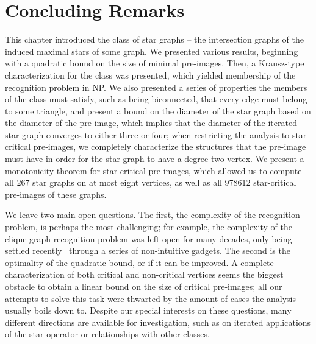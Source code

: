 \section{Concluding Remarks}

This chapter introduced the class of star graphs -- the intersection graphs of the induced maximal stars of some graph.
We presented various results, beginning with a quadratic bound on the size of minimal pre-images.
Then, a Krausz-type characterization for the class was presented, which yielded membership of the recognition problem in \textsf{NP}.
We also presented a series of properties the members of the class must satisfy, such as being biconnected, that every edge must belong to some triangle, and present a bound on the diameter of the star graph based on the diameter of the pre-image, which implies that the diameter of the iterated star graph converges to either three or four;  when restricting the analysis to star-critical pre-images, we completely characterize the structures that the pre-image must have in order for the star graph to have a degree two vertex.
We present a monotonicity theorem for star-critical pre-images, which allowed us to compute all 267 star graphs on at most eight vertices, as well as all 978612 star-critical pre-images of these graphs.

We leave two main open questions.
The first, the complexity of the recognition problem, is perhaps the most challenging; for example, the complexity of the clique graph recognition problem was left open for many decades, only being settled recently~\citep{clique_recognition} through a series of non-intuitive gadgets.
The second is the optimality of the quadratic bound, or if it can be improved.
A complete characterization of both critical and non-critical vertices seems the biggest obstacle to obtain a linear bound on the size of critical pre-images; all our attempts to solve this task were thwarted by the amount of cases the analysis usually boils down to.
Despite our special interests on these questions, many different directions are available for investigation, such as on iterated applications of the star operator or relationships with other classes.